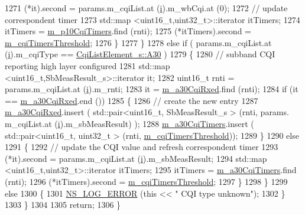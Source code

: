 \begin{DoxyCode}
1271               (*it).second = params.m\_cqiList.at (\hyperlink{bernuolliDistribution_8m_a6f6ccfcf58b31cb6412107d9d5281426}{i}).m\_wbCqi.at (0);
1272               \textcolor{comment}{// update correspondent timer}
1273               std::map <uint16\_t,uint32\_t>::iterator itTimers;
1274               itTimers = \hyperlink{classns3_1_1TdMtFfMacScheduler_a6c94a7bc6c5718afd7c7cf8dbd1ed8e5}{m\_p10CqiTimers}.find (rnti);
1275               (*itTimers).second = \hyperlink{classns3_1_1TdMtFfMacScheduler_a63ad2273332391bf152913fe2dbfa186}{m\_cqiTimersThreshold};
1276             \}
1277         \}
1278       \textcolor{keywordflow}{else} \textcolor{keywordflow}{if} ( params.m\_cqiList.at (\hyperlink{bernuolliDistribution_8m_a6f6ccfcf58b31cb6412107d9d5281426}{i}).m\_cqiType == \hyperlink{structns3_1_1CqiListElement__s_a8f1bd827fd9842e7c07e39265d88299aab9a9d64494e36c89d7932a00edb056a7}{CqiListElement\_s::A30} )
1279         \{
1280           \textcolor{comment}{// subband CQI reporting high layer configured}
1281           std::map <uint16\_t,SbMeasResult\_s>::iterator it;
1282           uint16\_t rnti = params.m\_cqiList.at (\hyperlink{bernuolliDistribution_8m_a6f6ccfcf58b31cb6412107d9d5281426}{i}).m\_rnti;
1283           it = \hyperlink{classns3_1_1TdMtFfMacScheduler_a93119b003bd5fb4b3c5cfec5ba3be1b0}{m\_a30CqiRxed}.find (rnti);
1284           \textcolor{keywordflow}{if} (it == \hyperlink{classns3_1_1TdMtFfMacScheduler_a93119b003bd5fb4b3c5cfec5ba3be1b0}{m\_a30CqiRxed}.end ())
1285             \{
1286               \textcolor{comment}{// create the new entry}
1287               \hyperlink{classns3_1_1TdMtFfMacScheduler_a93119b003bd5fb4b3c5cfec5ba3be1b0}{m\_a30CqiRxed}.insert ( std::pair<uint16\_t, SbMeasResult\_s > (rnti, params.
      m\_cqiList.at (\hyperlink{bernuolliDistribution_8m_a6f6ccfcf58b31cb6412107d9d5281426}{i}).m\_sbMeasResult) );
1288               \hyperlink{classns3_1_1TdMtFfMacScheduler_ad812aff03ccff65b09c8d25912522994}{m\_a30CqiTimers}.insert ( std::pair<uint16\_t, uint32\_t > (rnti, 
      \hyperlink{classns3_1_1TdMtFfMacScheduler_a63ad2273332391bf152913fe2dbfa186}{m\_cqiTimersThreshold}));
1289             \}
1290           \textcolor{keywordflow}{else}
1291             \{
1292               \textcolor{comment}{// update the CQI value and refresh correspondent timer}
1293               (*it).second = params.m\_cqiList.at (\hyperlink{bernuolliDistribution_8m_a6f6ccfcf58b31cb6412107d9d5281426}{i}).m\_sbMeasResult;
1294               std::map <uint16\_t,uint32\_t>::iterator itTimers;
1295               itTimers = \hyperlink{classns3_1_1TdMtFfMacScheduler_ad812aff03ccff65b09c8d25912522994}{m\_a30CqiTimers}.find (rnti);
1296               (*itTimers).second = \hyperlink{classns3_1_1TdMtFfMacScheduler_a63ad2273332391bf152913fe2dbfa186}{m\_cqiTimersThreshold};
1297             \}
1298         \}
1299       \textcolor{keywordflow}{else}
1300         \{
1301           \hyperlink{group__logging_ga0261a8db1d4ac5f79417d117634fd455}{NS\_LOG\_ERROR} (\textcolor{keyword}{this} << \textcolor{stringliteral}{" CQI type unknown"});
1302         \}
1303     \}
1304 
1305   \textcolor{keywordflow}{return};
1306 \}
\end{DoxyCode}


